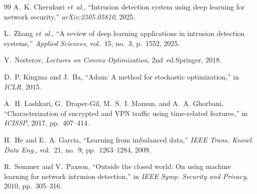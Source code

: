 \documentclass[conference]{IEEEtran}
\theoremstyle{definition}
\begin{document}
\begin{thebibliography}{99}
 A.~K. Cherukuri \emph{et~al.}, ``Intrusion detection system using deep learning for network security,'' \emph{arXiv:2505.05810}, 2025.

 L.~Zhang \emph{et~al.}, ``A review of deep learning applications in intrusion detection systems,'' \emph{Applied Sciences}, vol.~15, no.~3, p.~1552, 2025.

 Y.~Nesterov, \emph{Lectures on Convex Optimization}, 2nd~ed.\quad Springer, 2018.

 D.~P. Kingma and J.~Ba, ``Adam: A method for stochastic optimization,'' in \emph{ICLR}, 2015.

 A.~H. Lashkari, G.~Draper-Gil, M.~S.~I. Mamun, and A.~A. Ghorbani, ``Characterization of encrypted and VPN traffic using time-related features,'' in \emph{ICISSP}, 2017, pp.~407--414.

 H.~He and E.~A. Garcia, ``Learning from imbalanced data,'' \emph{IEEE Trans. Knowl. Data Eng.}, vol.~21, no.~9, pp.~1263--1284, 2009.

 R.~Sommer and V.~Paxson, ``Outside the closed world: On using machine learning for network intrusion detection,'' in \emph{IEEE Symp. Security and Privacy}, 2010, pp.~305--316.

\end{thebibliography}
\end{document}
